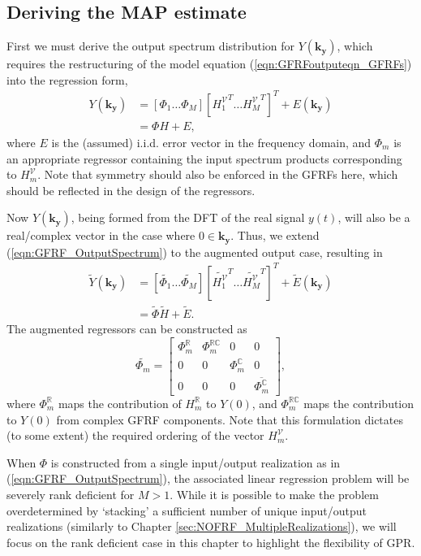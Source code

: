 \subsection{Deriving the MAP estimate}

First we must derive the output spectrum distribution for $Y(\mathbf{k_y})$, which requires the restructuring of the model equation (\ref{eqn:GFRFoutputeqn_GFRFs}) into the regression form,
\begin{align}
Y(\mathbf{k_y}) &=  [\Phi_1 \hdots \Phi_M] [{H_1^{\mathcal{V}}}^T \hdots {H_M^{\mathcal{V}}}^T]^T + E(\mathbf{k_y}) \nonumber \\
&= \Phi H + E,
\label{eqn:GFRF_OutputSpectrum}
\end{align}
where $E$ is the (assumed) i.i.d. error vector in the frequency domain, and $\Phi_m$ is an appropriate regressor containing the input spectrum products corresponding to $H_m^{\mathcal{V}}$. Note that symmetry should also be enforced in the GFRFs here, which should be reflected in the design of the regressors. 

Now $Y(\mathbf{k_y})$, being formed from the DFT of the real signal $y(t)$, will also be a real/complex vector in the case where $0 \in \mathbf{k_y}$. Thus, we extend (\ref{eqn:GFRF_OutputSpectrum}) to the augmented output case, resulting in
\begin{align}
\label{AugmentedModel}
\widetilde{Y}(\mathbf{k_y}) &=  [\widetilde{\Phi_1} \hdots \widetilde{\Phi_M}] [\widetilde{H_1^{\mathcal{V}}}^T \hdots \widetilde{H_M^{\mathcal{V}}}^T]^T + \widetilde{E}(\mathbf{k_y}) \nonumber \\
&= \widetilde{\Phi}\widetilde{H} + \widetilde{E}.
\end{align}
The augmented regressors can be constructed as
\begin{equation}
\widetilde{\Phi_m} = \begin{bmatrix}\Phi_m^{\mathbb{R}} & \Phi_m^{\mathbb{RC}} & 0 & 0 \\0 & 0 & \Phi_m^{\mathbb{C}} & 0 \\ 0 & 0 & 0 & \overline{\Phi_m^{\mathbb{C}}} \end{bmatrix},
\end{equation}
where $\Phi_m^{\mathbb{R}}$ maps the contribution of $H_m^{\mathbb{R}}$ to $Y(0)$, and $\Phi_m^{\mathbb{RC}}$ maps the contribution to $Y(0)$ from complex GFRF components. Note that this formulation dictates (to some extent) the required ordering of the vector $H_m^{\mathcal{V}}$. 

\begin{rem}
\label{rem:GFRF_RankDeficiency}
When $\Phi$ is constructed from a single input/output realization as in (\ref{eqn:GFRF_OutputSpectrum}), the associated linear regression problem will be severely rank deficient for $M>1$. While it is possible to make the problem overdetermined by `stacking' a sufficient number of unique input/output realizations (similarly to Chapter \ref{sec:NOFRF_MultipleRealizations}), we will focus on the rank deficient case in this chapter to highlight the flexibility of GPR.
\end{rem}


